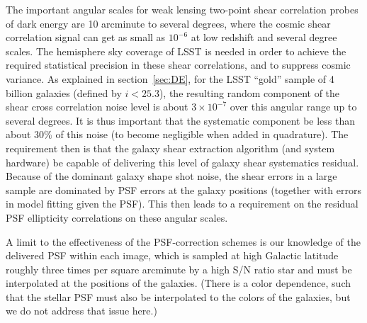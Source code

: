 The important angular scales for weak lensing two-point shear correlation probes of dark
energy are 10 arcminute to several degrees, where the cosmic shear correlation signal can
get as small as $10^{-6}$ at low redshift and several degree scales. The hemisphere sky
coverage of LSST is needed in order to achieve the required statistical precision in these
shear correlations, and to suppress cosmic variance.  As explained in section~\ref{sec:DE},
for the LSST ``gold'' sample of 4 billion galaxies (defined by $i<25.3$), the resulting random
component of the shear cross correlation noise level is about $3\times10^{-7}$ over this
angular range up to several degrees.  It is thus important that the systematic component be
less than about 30\% of this noise (to become negligible when added in quadrature).  The
requirement then is that the galaxy shear extraction algorithm (and system hardware) be
capable of delivering this level of galaxy shear systematics residual.  Because of the dominant
galaxy shape shot noise, the shear errors in a large sample are dominated by PSF errors at the
galaxy positions (together with errors in model fitting given the PSF). This then leads to a
requirement on the residual PSF ellipticity correlations on these angular scales.

A limit to the effectiveness of the PSF-correction schemes is our
knowledge of the delivered PSF within each image, which is sampled
at high Galactic latitude roughly three times per square arcminute by a
high S/N ratio star and must be interpolated at the positions of the
galaxies. (There is a color dependence, such that the stellar PSF must
also be interpolated to the colors of the galaxies, but we do not
address that issue here.)

